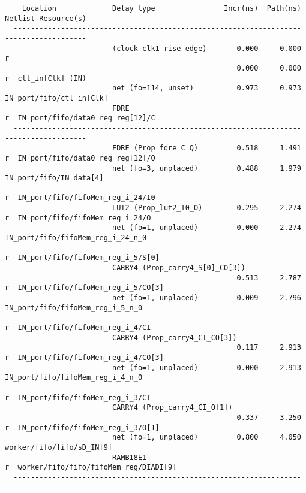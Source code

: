\documentclass{article}
\begin{document}
\begin{lstlisting}
    Location             Delay type                Incr(ns)  Path(ns)    Netlist Resource(s)
  -------------------------------------------------------------------    -------------------
                         (clock clk1 rise edge)       0.000     0.000 r  
                                                      0.000     0.000 r  ctl_in[Clk] (IN)
                         net (fo=114, unset)          0.973     0.973    IN_port/fifo/ctl_in[Clk]
                         FDRE                                         r  IN_port/fifo/data0_reg_reg[12]/C
  -------------------------------------------------------------------    -------------------
                         FDRE (Prop_fdre_C_Q)         0.518     1.491 r  IN_port/fifo/data0_reg_reg[12]/Q
                         net (fo=3, unplaced)         0.488     1.979    IN_port/fifo/IN_data[4]
                                                                      r  IN_port/fifo/fifoMem_reg_i_24/I0
                         LUT2 (Prop_lut2_I0_O)        0.295     2.274 r  IN_port/fifo/fifoMem_reg_i_24/O
                         net (fo=1, unplaced)         0.000     2.274    IN_port/fifo/fifoMem_reg_i_24_n_0
                                                                      r  IN_port/fifo/fifoMem_reg_i_5/S[0]
                         CARRY4 (Prop_carry4_S[0]_CO[3])
                                                      0.513     2.787 r  IN_port/fifo/fifoMem_reg_i_5/CO[3]
                         net (fo=1, unplaced)         0.009     2.796    IN_port/fifo/fifoMem_reg_i_5_n_0
                                                                      r  IN_port/fifo/fifoMem_reg_i_4/CI
                         CARRY4 (Prop_carry4_CI_CO[3])
                                                      0.117     2.913 r  IN_port/fifo/fifoMem_reg_i_4/CO[3]
                         net (fo=1, unplaced)         0.000     2.913    IN_port/fifo/fifoMem_reg_i_4_n_0
                                                                      r  IN_port/fifo/fifoMem_reg_i_3/CI
                         CARRY4 (Prop_carry4_CI_O[1])
                                                      0.337     3.250 r  IN_port/fifo/fifoMem_reg_i_3/O[1]
                         net (fo=1, unplaced)         0.800     4.050    worker/fifo/fifo/sD_IN[9]
                         RAMB18E1                                     r  worker/fifo/fifo/fifoMem_reg/DIADI[9]
  -------------------------------------------------------------------    -------------------


\end{lstlisting}
\end{document}
